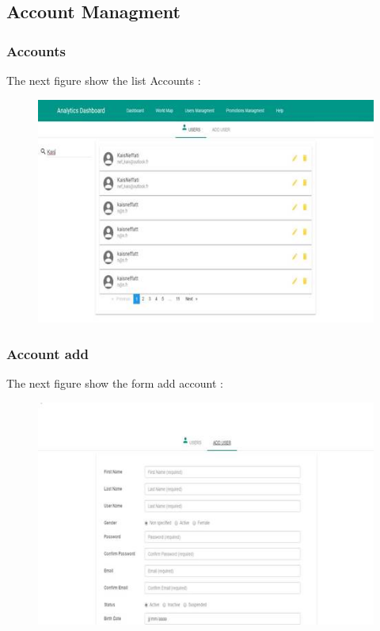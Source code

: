 \subsection{Account Managment}
\label{sec:sec01}
\subsubsection{Accounts}
\label{sec:sec01}
The next figure show the list Accounts :
\begin{figure}[h!]
	\centering
	\includegraphics[height=0.3\textheight]{fig01/UserManagement}
	\label{fig:FilialesEtClients}
\end{figure}
\subsubsection{Account add}
\label{sec:sec01}
The next figure show the form add account :
\begin{figure}[h!]
	\centering
	\includegraphics[height=0.3\textheight]{fig01/UserManagementAdd}
	\label{fig:FilialesEtClients}
\end{figure}
